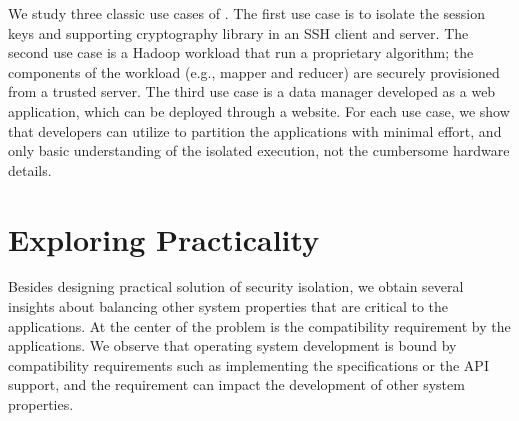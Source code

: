 {%
We study three classic use cases of \civet{}.
The first use case is to isolate the 
session keys and supporting cryptography library in an SSH client and server.
The second use case is a Hadoop workload that run a proprietary algorithm;
the components of the workload (e.g., mapper and reducer)
are securely provisioned from a trusted server.
The third use case is a data manager developed as a web application, which can be deployed through a website.
For each use case, we show that developers can utilize \civet{} to partition the applications with minimal effort,
and only basic understanding of the isolated execution,
not the cumbersome hardware details.  %


\section{Exploring Practicality}

Besides designing practical solution of security isolation,
we obtain several insights about balancing other system properties
that are critical to the applications.
At the center of the problem is the compatibility requirement by the applications.
We observe that operating system development is bound by compatibility requirements such as implementing the specifications or the API support, and the requirement can impact the development of other system properties.

}
